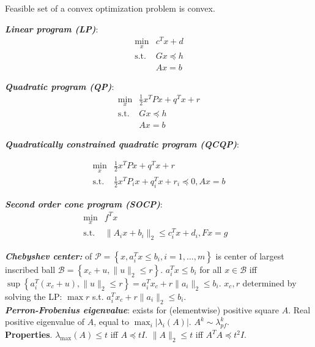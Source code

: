 \documentclass[a4paper, 11pt, twocolumn, landscape]{article}
\theoremstyle{lemma-style}
\theoremstyle{thm-style}
\theoremstyle{prop-style}
\theoremstyle{cor-style}
\renewcommand{\emph}[1]{\textbf{\textit{#1}}}
\begin{document}
\begin{small}
Feasible set of a convex optimization problem is convex.

\begin{multicols}{2}
  \emph{\noindent Linear program (LP)}:
  \begin{displaymath}
    \begin{array}{ll}
      \min_{x} & c^T x + d\\
      \text{s.t.} & G x \preceq h \\
      & A x = b
    \end{array}
  \end{displaymath}

  \emph{\noindent Quadratic program (QP)}:
  \begin{displaymath}
    \begin{array}{ll}
      \min_{x} & \frac{1}{2} x^T P x + q^T x + r\\
      \text{s.t.} & G x \preceq h \\
      & A x = b
    \end{array}
  \end{displaymath}

  \emph{\noindent Quadratically constrained quadratic program (QCQP)}:
  
  \begin{displaymath}
    \begin{array}{ll}
      \min_{x} & \frac{1}{2} x^T P x + q^T x + r \\
      \text{s.t.} & \frac{1}{2} x^T P_i x + q_i^T x + r_i \preceq 0, A x = b
    \end{array}
  \end{displaymath}

  \emph{\noindent Second order cone program (SOCP)}:
  \begin{displaymath}
    \begin{array}{lll}
      \min_{x} & f^T x &\\
      \text{s.t.} & \|A_i x + b_i\|_2 \leq c_i^T x + d_i, F x = g
    \end{array}
  \end{displaymath}
\end{multicols}

\noindent \emph{Chebyshev center:} of $\mathcal{P} = \left\{ x, a_i^T x \leq b_i, i = 1, \dots, m \right\}$ is center of largest inscribed ball $\mathcal{B} = \left\{ x_c + u, \|u\|_2 \leq r \right\}$. $a_i^T x \leq b_i$ for all $x \in \mathcal{B}$ iff $\sup \left\{ a_i^T \left( x_c + u \right), \|u\|_2 \leq r \right\} = a_i^T x_c + r \|a_i\|_2 \leq b_i$. $x_c, r$ determined by solving the LP: $\max r$ s.t. $a_i^T x_c + r \|a_i\|_2 \leq b_i$. \\
\emph{Perron-Frobenius eigenvalue}: exists for (elementwise) positive square $A$. Real positive eigenvalue of $A$, equal to $\max_i |\lambda_i(A)|$. $A^k \sim \lambda_{pf}^k$. \\
\textbf{Properties}. $\lambda_{\max}(A) \leq t$ iff $A \preceq tI$. $\|A\|_2 \leq t$ iff $A^TA \preceq t^2I$.


\end{small}
\end{document}
